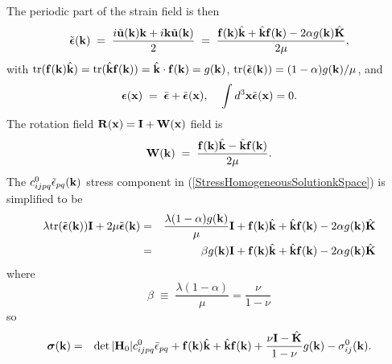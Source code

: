 \documentclass[12pt]{article}
\def\bmath#1{\mbox{\boldmath$#1$}}
\begin{document}
The periodic part of the strain field is then
\begin{equation}
 \tilde{\bmath{\epsilon}}({\bf k}) \;=\; \frac{i\tilde{\bf u}({\bf k}){\bf k}+i{\bf k}\tilde{\bf u}({\bf k})}{2} \;=\;
\frac{{\bf f}({\bf k})\hat{\bf k}+\hat{\bf k}{\bf f}({\bf k}) - 2\alpha g({\bf k})\hat{\bf K}}
 {2\mu},
\end{equation}
with ${\rm tr}({\bf f}({\bf k})\hat{\bf k})={\rm tr}(\hat{\bf k}{\bf
f}({\bf k}))=\hat{\bf k}\cdot {\bf f}({\bf k})=g({\bf k})$, ${\rm tr}(\tilde{\bmath{\epsilon}}({\bf k}))=(1-\alpha)g({\bf k})/\mu$, and
\begin{equation}
 \bmath{\epsilon}({\bf x}) \;=\; \bar{\bmath{\epsilon}} + 
 \tilde{\bmath{\epsilon}}({\bf x}), \;\;\;\;
 \int d^3{\bf x} \tilde{\bmath{\epsilon}}({\bf x}) = 0.
\end{equation}
The rotation field ${\bf R}({\bf x})={\bf I}+{\bf W}({\bf x})$ 
 field is
\begin{equation}
 {\bf W}({\bf k}) \;=\; 
\frac{{\bf f}({\bf k})\hat{\bf k}-\hat{\bf k}{\bf f}({\bf k})}
 {2\mu}.
\end{equation}
The $c_{ijpq}^0\tilde{\epsilon}_{pq}({\bf k})$
stress component in (\ref{StressHomogeneousSolutionkSpace}) is simplified to be
\begin{eqnarray}
 \lambda {\rm tr}(\tilde{\bmath{\epsilon}}({\bf k})){\bf I} + 2\mu \tilde{\bmath{\epsilon}}({\bf k})  =&&  
\frac{\lambda(1-\alpha)g({\bf k})}{\mu}{\bf I} + 
 {\bf f}({\bf k})\hat{\bf k}+\hat{\bf k}{\bf f}({\bf k}) - 2\alpha g({\bf k})\hat{\bf K} \nonumber\\
 =&& \beta g({\bf k}){\bf I} + {\bf f}({\bf k})\hat{\bf k}+\hat{\bf k}{\bf f}({\bf k}) - 2\alpha g({\bf k})\hat{\bf K}
\end{eqnarray}
where
\begin{equation}
 \beta \;\equiv\; \frac{\lambda(1-\alpha)}{\mu} = \frac{\nu}{1-\nu}
\end{equation}
so
\begin{eqnarray}
 \bmath{\sigma}({\bf k}) =&& \det|{\bf H}_0|c_{ijpq}^0\bar{\epsilon}_{pq} 
+ {\bf f}({\bf k})\hat{\bf k}+\hat{\bf k}{\bf f}({\bf k}) 
+ \frac{\nu{\bf I}-\hat{\bf K}}{1-\nu}g({\bf k})  - \sigma^0_{ij}({\bf k}).
\label{StressIsotropicHomogeneousSolutionkSpace}
\end{eqnarray}
\end{document}
